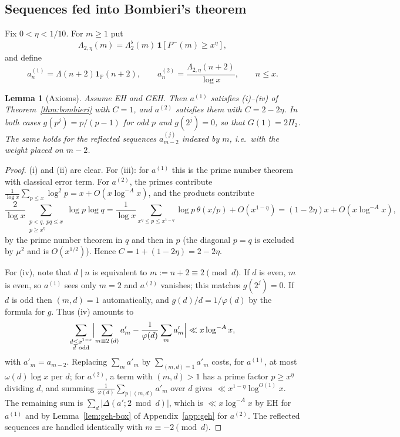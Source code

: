 \documentclass[11pt]{amsart}
\newtheorem{lemma}[theorem]{Lemma}
\theoremstyle{definition}
\theoremstyle{remark}
\newcommand{\PP}{\mathbb{P}}
\newcommand{\Lflat}{\Lambda_2^{\flat}}
\begin{document}
\subsection{Sequences fed into Bombieri's theorem}
Fix $0<\eta<1/10$. For $m\ge1$ put
\[
\Lambda_{2,\eta}(m)=\Lflat(m)\,\mathbf 1[P^-(m)\ge x^\eta],
\]
and define
\[
a^{(1)}_n=\Lambda(n+2)\mathbf 1_{\PP}(n+2),\qquad a^{(2)}_n=\frac{\Lambda_{2,\eta}(n+2)}{\log x},\qquad n\le x .
\]

\begin{lemma}[Axioms]\label{lem:axioms}
Assume EH and GEH. Then $a^{(1)}$ satisfies (i)--(iv) of Theorem~\ref{thm:bombieri} with $C=1$, and $a^{(2)}$ satisfies them with $C=2-2\eta$. In both cases $g(p^j)=p/(p-1)$ for odd $p$ and $g(2^j)=0$, so that $G(1)=2\Pi_2$. The same holds for the reflected sequences $a^{(j)}_{m-2}$ indexed by $m$, i.e.\ with the weight placed on $m-2$.
\end{lemma}
\begin{proof}
(i) and (ii) are clear. For (iii): for $a^{(1)}$ this is the prime number theorem with classical error term. For $a^{(2)}$, the primes contribute $\frac1{\log x}\sum_{p\le x}\log^2p=x+O(x\log^{-A}x)$, and the products contribute
\[
\frac{2}{\log x}\sum_{\substack{p<q,\ pq\le x\\ p\ge x^\eta}}\log p\log q=\frac1{\log x}\sum_{x^\eta\le p\le x^{1-\eta}}\log p\,\theta(x/p)+O(x^{1-\eta})=(1-2\eta)x+O(x\log^{-A}x),
\]
by the prime number theorem in $q$ and then in $p$ (the diagonal $p=q$ is excluded by $\mu^2$ and is $O(x^{1/2})$). Hence $C=1+(1-2\eta)=2-2\eta$.

For (iv), note that $d\mid n$ is equivalent to $m:=n+2\equiv2\pmod d$. If $d$ is even, $m$ is even, so $a^{(1)}$ sees only $m=2$ and $a^{(2)}$ vanishes; this matches $g(2^j)=0$. If $d$ is odd then $(m,d)=1$ automatically, and $g(d)/d=1/\varphi(d)$ by the formula for $g$. Thus (iv) amounts to
\[
\sum_{\substack{d\le x^{1-\varepsilon}\\ d\ \mathrm{odd}}}\Bigl|\sum_{m\equiv2\,(d)}a'_m-\frac1{\varphi(d)}\sum_{m}a'_m\Bigr|\ll x\log^{-A}x,
\]
with $a'_m=a_{m-2}$. Replacing $\sum_ma'_m$ by $\sum_{(m,d)=1}a'_m$ costs, for $a^{(1)}$, at most $\omega(d)\log x$ per $d$; for $a^{(2)}$, a term with $(m,d)>1$ has a prime factor $p\ge x^\eta$ dividing $d$, and summing $\frac1{\varphi(d)}\sum_{p\mid(m,d)}a'_m$ over $d$ gives $\ll x^{1-\eta}\log^{O(1)}x$. The remaining sum is $\sum_d|\Delta(a';2\bmod d)|$, which is $\ll x\log^{-A}x$ by EH for $a^{(1)}$ and by Lemma~\ref{lem:geh-box} of Appendix~\ref{app:geh} for $a^{(2)}$. The reflected sequences are handled identically with $m\equiv-2\pmod d$.
\end{proof}
\end{document}
